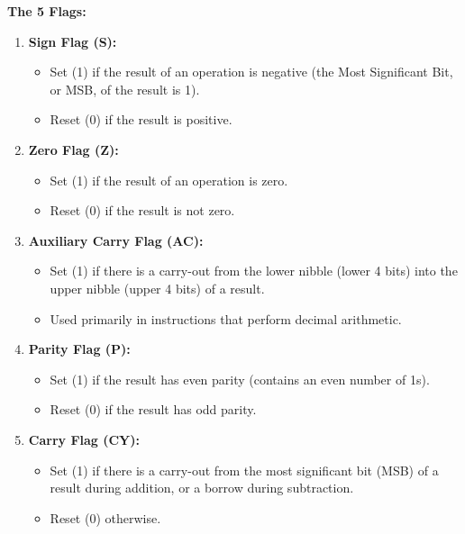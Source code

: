 \documentclass[
]{article}
\begin{document}
\textbf{The 5 Flags:}

\begin{enumerate}
\def\labelenumi{\arabic{enumi}.}
\item
  \textbf{Sign Flag (S):}

  \begin{itemize}
  \item
    Set (1) if the result of an operation is negative (the Most
    Significant Bit, or MSB, of the result is 1).
  \item
    Reset (0) if the result is positive.
  \end{itemize}
\item
  \textbf{Zero Flag (Z):}

  \begin{itemize}
  \item
    Set (1) if the result of an operation is zero.
  \item
    Reset (0) if the result is not zero.
  \end{itemize}
\item
  \textbf{Auxiliary Carry Flag (AC):}

  \begin{itemize}
  \item
    Set (1) if there is a carry-out from the lower nibble (lower 4 bits)
    into the upper nibble (upper 4 bits) of a result.
  \item
    Used primarily in instructions that perform decimal arithmetic.
  \end{itemize}
\item
  \textbf{Parity Flag (P):}

  \begin{itemize}
  \item
    Set (1) if the result has even parity (contains an even number of
    1s).
  \item
    Reset (0) if the result has odd parity.
  \end{itemize}
\item
  \textbf{Carry Flag (CY):}

  \begin{itemize}
  \item
    Set (1) if there is a carry-out from the most significant bit (MSB)
    of a result during addition, or a borrow during subtraction.
  \item
    Reset (0) otherwise.
  \end{itemize}
\end{enumerate}
\end{document}
